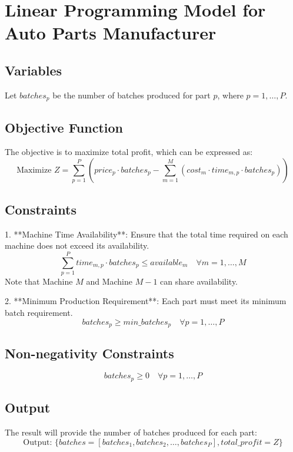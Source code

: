 \documentclass{article}
\begin{document}
\section*{Linear Programming Model for Auto Parts Manufacturer}

\subsection*{Variables}
Let \(batches_{p}\) be the number of batches produced for part \(p\), where \(p = 1, \ldots, P\).

\subsection*{Objective Function}
The objective is to maximize total profit, which can be expressed as: 
\[
\text{Maximize } Z = \sum_{p=1}^{P} \left( price_{p} \cdot batches_{p} - \sum_{m=1}^{M} (cost_{m} \cdot time_{m,p} \cdot batches_{p}) \right)
\]

\subsection*{Constraints}
1. **Machine Time Availability**: Ensure that the total time required on each machine does not exceed its availability.
   \[
   \sum_{p=1}^{P} time_{m,p} \cdot batches_{p} \leq available_{m} \quad \forall m = 1, \ldots, M
   \]
   Note that Machine \(M\) and Machine \(M-1\) can share availability.

2. **Minimum Production Requirement**: Each part must meet its minimum batch requirement.
   \[
   batches_{p} \geq min\_batches_{p} \quad \forall p = 1, \ldots, P
   \]

\subsection*{Non-negativity Constraints}
\[
batches_{p} \geq 0 \quad \forall p = 1, \ldots, P
\]

\subsection*{Output}
The result will provide the number of batches produced for each part:
\[
\text{Output: } \{ batches = [batches_{1}, batches_{2}, \ldots, batches_{P}], total\_profit = Z \}
\]
\end{document}
